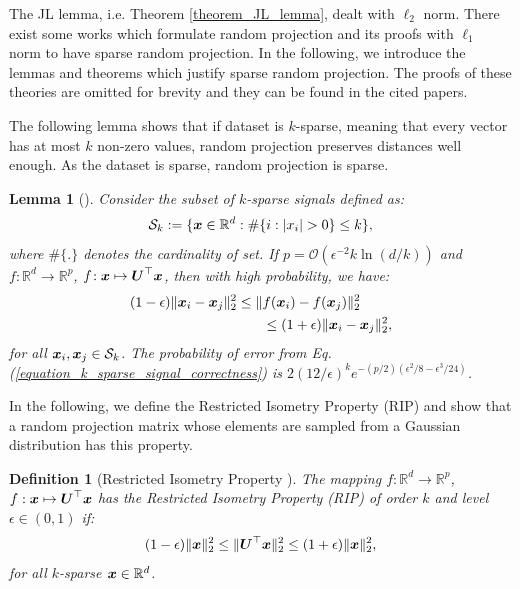 \documentclass{article}
\newtheorem{lemma}{Lemma}
\newtheorem{definition}{Definition}
\def\b{\ensuremath\boldsymbol}
\begin{document}
The JL lemma, i.e. Theorem \ref{theorem_JL_lemma}, dealt with $\ell_2$ norm. There exist some works which formulate random projection and its proofs with $\ell_1$ norm to have sparse random projection. 
In the following, we introduce the lemmas and theorems which justify sparse random projection. The proofs of these theories are omitted for brevity and they can be found in the cited papers. 

The following lemma shows that if dataset is $k$-sparse, meaning that every vector has at most $k$ non-zero values, random projection preserves distances well enough. As the dataset is sparse, random projection is sparse.
\begin{lemma}[\cite{baraniuk2006johnson}]
Consider the subset of $k$-sparse signals defined as:
\begin{align}
\mathcal{S}_k := \{\b{x} \in \mathbb{R}^d : \#\{i : |x_i| > 0\} \leq k\},
\end{align}
where $\#\{.\}$ denotes the cardinality of set. If $p = \mathcal{O}(\epsilon^{-2} k \ln(d/k))$ and $f\!: \mathbb{R}^d \rightarrow \mathbb{R}^p$, $f\!: \b{x} \mapsto \b{U}^\top \b{x}$, then with high probability, we have:
\begin{equation}\label{equation_k_sparse_signal_correctness}
\begin{aligned}
(1 - \epsilon) \|\b{x}_i - \b{x}_j\|_2^2 \leq \|&f(\b{x}_i) - f(\b{x}_j)\|_2^2 \\
&\leq (1 + \epsilon) \|\b{x}_i - \b{x}_j\|_2^2,
\end{aligned}
\end{equation}
for all $\b{x}_i, \b{x}_j \in \mathcal{S}_k$. The probability of error from Eq. (\ref{equation_k_sparse_signal_correctness}) is $2(12/\epsilon)^k e^{-(p/2) (\epsilon^2/8 - \epsilon^3/24)}$. 
\end{lemma}

In the following, we define the Restricted Isometry Property (RIP) and show that a random projection matrix whose elements are sampled from a Gaussian distribution has this property.
\begin{definition}[Restricted Isometry Property \cite{candes2006stable}]
The mapping $f: \mathbb{R}^d \rightarrow \mathbb{R}^p$, $f: \b{x} \mapsto \b{U}^\top \b{x}$ has the Restricted Isometry Property (RIP) of order $k$ and level $\epsilon \in (0,1)$ if:
\begin{align}
(1 - \epsilon) \|\b{x}\|_2^2 \leq \|\b{U}^\top \b{x}\|_2^2 \leq (1 + \epsilon) \|\b{x}\|_2^2,
\end{align}
for all $k$-sparse $\b{x} \in \mathbb{R}^d$.
\end{definition}
\end{document}
